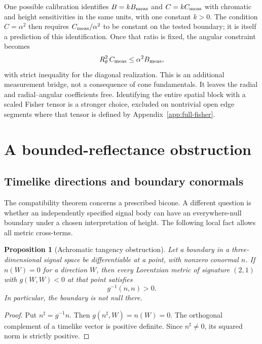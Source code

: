 \documentclass[11pt,letterpaper]{article}
\theoremstyle{plain}
\newtheorem{proposition}{Proposition}
\begin{document}
One possible calibration identifies $B=kB_{\rm meas}$ and $C=kC_{\rm meas}$ with chromatic and height sensitivities in the same units, with one constant $k>0$. The condition $C=\alpha^2$ then requires $C_{\rm meas}/\alpha^2$ to be constant on the tested boundary; it is itself a prediction of this identification. Once that ratio is fixed, the angular constraint becomes
\begin{equation}
 R_\theta^2\,C_{\rm meas}\leq\alpha^2 B_{\rm meas},
 \label{eq:relative-calibration}
\end{equation}
with strict inequality for the diagonal realization. This is an additional measurement bridge, not a consequence of cone fundamentals. It leaves the radial and radial--angular coefficients free. Identifying the entire spatial block with a scaled Fisher tensor is a stronger choice, excluded on nontrivial open edge segments where that tensor is defined by Appendix~\ref{app:full-fisher}.

\section{A bounded-reflectance obstruction}
\label{sec:object-obstruction}
\subsection{Timelike directions and boundary conormals}
The compatibility theorem concerns a prescribed bicone. A different question is whether an independently specified signal body can have an everywhere-null boundary under a chosen interpretation of height. The following local fact allows all metric cross-terms.

\begin{proposition}[Achromatic tangency obstruction]
\label{prop:timelike-conormal}
Let a boundary in a three-dimensional signal space be differentiable at a point, with nonzero conormal $n$. If $n(W)=0$ for a direction $W$, then every Lorentzian metric of signature $(2,1)$ with $g(W,W)<0$ at that point satisfies
\begin{equation}
 g^{-1}(n,n)>0.
 \label{eq:timelike-conormal}
\end{equation}
In particular, the boundary is not null there.
\end{proposition}
\begin{proof}
Put $n^\sharp=g^{-1}n$. Then $g(n^\sharp,W)=n(W)=0$. The orthogonal complement of a timelike vector is positive definite. Since $n^\sharp\ne0$, its squared norm is strictly positive.
\end{proof}
\end{document}
